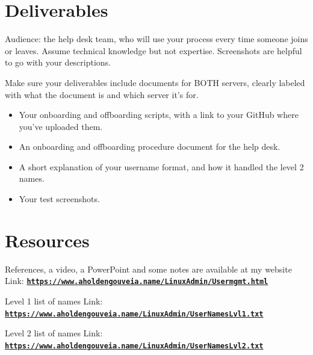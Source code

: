 \documentclass[12pt]{article}
\begin{document}
\section*{Deliverables}
Audience: the help desk team, who will use your process every time someone joins or leaves. Assume technical knowledge but not expertise.  Screenshots are helpful to go with your descriptions.

Make sure your deliverables include documents for BOTH servers, clearly labeled with what the document is and which server it's for.
\begin{itemize}
    \item Your onboarding and offboarding scripts, with a link to your GitHub where you've uploaded them.
    \item An onboarding and offboarding procedure document for the help desk.
    \item A short explanation of your username format, and how it handled the level 2 names.
    \item Your test screenshots.
\end{itemize}

\section*{Resources}
References, a video, a PowerPoint and some notes are available at my website
Link: \href{https://www.aholdengouveia.name/LinuxAdmin/Usermgmt.html}{\textbf{\nolinkurl{https://www.aholdengouveia.name/LinuxAdmin/Usermgmt.html}}}

Level 1 list of names
Link: \href{https://www.aholdengouveia.name/LinuxAdmin/UserNamesLvl1.txt}{\textbf{\nolinkurl{https://www.aholdengouveia.name/LinuxAdmin/UserNamesLvl1.txt}}}

Level 2 list of names
Link: \href{https://www.aholdengouveia.name/LinuxAdmin/UserNamesLvl2.txt}{\textbf{\nolinkurl{https://www.aholdengouveia.name/LinuxAdmin/UserNamesLvl2.txt}}}

\end{document}
